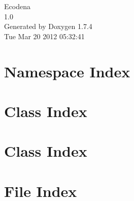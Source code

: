 \documentclass[a4paper]{book}
\begin{document}
\hypersetup{pageanchor=false}
\begin{titlepage}
\vspace*{7cm}
\begin{center}
{\Large Ecodena \\[1ex]\large 1.0 }\\
\vspace*{1cm}
{\large Generated by Doxygen 1.7.4}\\
\vspace*{0.5cm}
{\small Tue Mar 20 2012 05:32:41}\\
\end{center}
\end{titlepage}
\clearemptydoublepage
{}
\tableofcontents
\clearemptydoublepage
{}
\hypersetup{pageanchor=true}
\chapter{Namespace Index}

\chapter{Class Index}

\chapter{Class Index}

\chapter{File Index}

\end{document}
